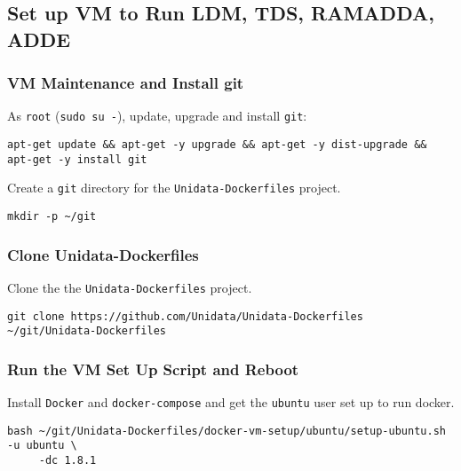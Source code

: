 \documentclass[onecolumn,9pt]{article}
\begin{document}
\subsection{Set up VM to Run LDM, TDS, RAMADDA, ADDE}
\label{sec:orgheadline29}
\subsubsection{VM Maintenance and Install git}
\label{sec:orgheadline14}

As \texttt{root} (\texttt{sudo su -}), update, upgrade and install \texttt{git}:

\lstset{frame=lines,basicstyle=\footnotesize,numbers=left,numberstyle=\tiny,language=sh,label= ,caption= ,captionpos=b}
\begin{lstlisting}
apt-get update && apt-get -y upgrade && apt-get -y dist-upgrade && apt-get -y install git
\end{lstlisting}

Create a \texttt{git} directory for the \texttt{Unidata-Dockerfiles} project.

\lstset{frame=lines,basicstyle=\footnotesize,numbers=left,numberstyle=\tiny,language=sh,label= ,caption= ,captionpos=b}
\begin{lstlisting}
mkdir -p ~/git
\end{lstlisting}

\subsubsection{Clone Unidata-Dockerfiles}
\label{sec:orgheadline15}

Clone the the \texttt{Unidata-Dockerfiles} project.

\lstset{frame=lines,basicstyle=\footnotesize,numbers=left,numberstyle=\tiny,language=:eval,label= ,caption= ,captionpos=b}
\begin{lstlisting}
git clone https://github.com/Unidata/Unidata-Dockerfiles ~/git/Unidata-Dockerfiles
\end{lstlisting}

\subsubsection{Run the VM Set Up Script and Reboot}
\label{sec:orgheadline16}

Install \texttt{Docker} and \texttt{docker-compose} and get the \texttt{ubuntu} user set up to run docker.

\lstset{frame=lines,basicstyle=\footnotesize,numbers=left,numberstyle=\tiny,language=sh,label= ,caption= ,captionpos=b}
\begin{lstlisting}
bash ~/git/Unidata-Dockerfiles/docker-vm-setup/ubuntu/setup-ubuntu.sh -u ubuntu \
     -dc 1.8.1
\end{lstlisting}
\end{document}
